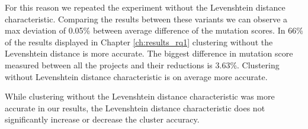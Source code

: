 \documentclass[../main]{subfiles}
\begin{document}
For this reason we repeated the experiment without the Levenshtein distance characteristic.
Comparing the results between these variants we can observe a max deviation of 0.05\% between average difference of the mutation scores.
In 66\% of the results displayed in Chapter \ref{ch:results_rq1} clustering without the Levenshtein distance is more accurate.
The biggest difference in mutation score measured between all the projects and their reductions is 3.63\%.
Clustering without Levenshtein distance characteristic is on average more accurate.
\begin{finding}
    While clustering without the Levenshtein distance characteristic was more accurate in our results, the Levenshtein distance characteristic does not significantly increase or decrease the cluster accuracy.
\end{finding}
\end{document}
